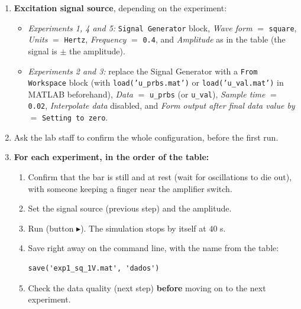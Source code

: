 \documentclass[a4paper,11pt]{article}
\begin{document}
\begin{enumerate}[label=$\square$, leftmargin=1.5em]
  \item \textbf{Excitation signal source}, depending on the experiment:
  \begin{itemize}
    \item \emph{Experiments 1, 4 and 5:} \texttt{Signal Generator} block, \emph{Wave form} $=$ \texttt{square}, \emph{Units} $=$ \texttt{Hertz}, \emph{Frequency} $=$ \texttt{0.4}, and \emph{Amplitude} as in the table (the signal is $\pm$ the amplitude).
    \item \emph{Experiments 2 and 3:} replace the Signal Generator with a \texttt{From Workspace} block (with \texttt{load('u\_prbs.mat')} or \texttt{load('u\_val.mat')} in MATLAB beforehand), \emph{Data} $=$ \texttt{u\_prbs} (or \texttt{u\_val}), \emph{Sample time} $=$ \texttt{0.02}, \emph{Interpolate data} disabled, and \emph{Form output after final data value by} $=$ \texttt{Setting to zero}.
  \end{itemize}

  \item Ask the lab staff to confirm the whole configuration, before the first run.

  \item \textbf{For each experiment, in the order of the table:}
  \begin{enumerate}[label=(\alph*)]
    \item Confirm that the bar is still and at rest (wait for oscillations to die out), with someone keeping a finger near the amplifier switch.
    \item Set the signal source (previous step) and the amplitude.
    \item Run (button $\blacktriangleright$). The simulation stops by itself at $40$ s.
    \item Save right away on the command line, with the name from the table:
    \begin{verbatim}
save('exp1_sq_1V.mat', 'dados')
    \end{verbatim}
    \item Check the data quality (next step) \textbf{before} moving on to the next experiment.
  \end{enumerate}


\end{enumerate}
\end{document}
